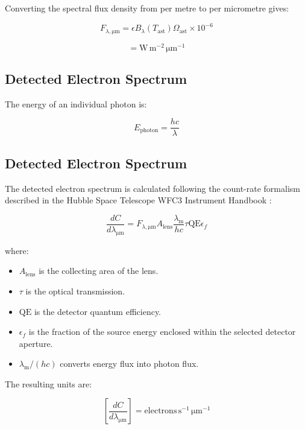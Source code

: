 \documentclass{article}
\begin{document}
Converting the spectral flux density from per metre to per micrometre gives:

\begin{equation}
F_{\lambda,\mathrm{\mu m}} =
\epsilon B_{\lambda}(T_{\mathrm{ast}})
\Omega_{\mathrm{ast}} \times 10^{-6}
\end{equation}

\begin{equation}
[F_{\lambda,\mathrm{\mu m}}] =
\mathrm{W\,m^{-2}\,\mu m^{-1}}
\end{equation}

\subsection{Detected Electron Spectrum}

The energy of an individual photon is:

\begin{equation}
E_{\mathrm{photon}} =
\frac{hc}{\lambda}
\end{equation}
\subsection{Detected Electron Spectrum}

The detected electron spectrum is calculated following the count-rate formalism described in the Hubble Space Telescope WFC3 Instrument Handbook \cite{marinelli2025wfc3}:

\begin{equation}
\frac{dC}{d\lambda_{\mathrm{\mu m}}} =
F_{\lambda,\mathrm{\mu m}}
A_{\mathrm{lens}}
\frac{\lambda_{\mathrm{m}}}{hc}
\tau
\mathrm{QE}
\epsilon_f
\end{equation}

where:
\begin{itemize}
    \item $A_{\mathrm{lens}}$ is the collecting area of the lens.
    \item $\tau$ is the optical transmission.
    \item $\mathrm{QE}$ is the detector quantum efficiency.
    \item $\epsilon_f$ is the fraction of the source energy enclosed within the selected detector aperture.
    \item $\lambda_{\mathrm{m}}/(hc)$ converts energy flux into photon flux.
\end{itemize}

The resulting units are:

\begin{equation}
\left[
\frac{dC}{d\lambda_{\mathrm{\mu m}}}
\right]
=
\mathrm{electrons\,s^{-1}\,\mu m^{-1}}
\end{equation}
\end{document}
